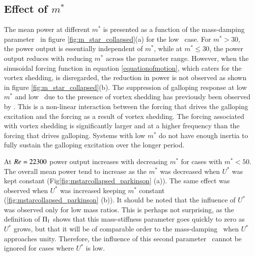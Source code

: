   



\subsection{Effect of $m^*$}

 
 

The mean power at different $m^*$ is presented as a function of the mass-damping parameter \massdamp\ in figure \ref{fig:m_star_collapsed}(a) for the low \reynoldsnumber\ case. For $m^*>30$, the power output is essentially independent of $m^*$, while at $m^* \leq 30$, the power output reduces with reducing $m^*$ across the parameter range. However, when the sinusoidal forcing function in equation \ref{equationofmotion}, which caters for the vortex shedding, is disregarded, the reduction in power is not observed as shown in figure \ref{fig:m_star_collapsed}(b). The suppression of galloping response at low $m^*$ and low \reynoldsnumber\ due to the presence of vortex shedding has previously been observed by \cite{Joly2012}. This is a non-linear interaction between the forcing that drives the galloping excitation and the forcing as a result of vortex shedding. The forcing associated with vortex  shedding is significantly larger and at a higher frequency than the forcing that drives galloping. Systems with low $m^*$ do not have enough inertia to fully sustain the galloping excitation over the longer period.

At $Re=22300$ power output increases with decreasing $m^*$ for cases with $m^*<50$. The overall mean power tend to increase as the $m^*$ was decreased when $U^*$ was kept constant (Fig\ref{fig:mstarcollapsed_parkinson} (a)). The same effect was observed when $U^*$ was increased keeping $m^*$ constant (\ref{fig:mstarcollapsed_parkinson} (b)). It should be noted that the influence of $U^*$ was observed only for low mass ratios. This is perhaps not surprising, as the definition of $\Pi_1$ shows that this mass-stiffness parameter goes quickly to zero as $U^*$ grows, but that it will be of comparable order to the mass-damping \massdamp\ when $U^*$ approaches unity. Therefore, the influence of this second parameter \massstiff\ cannot be ignored for cases where $U^*$ is low.

